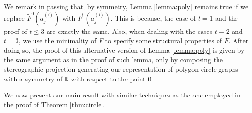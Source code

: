 \documentclass[12pt]{article}
\theoremstyle{definition}
\begin{document}
     We remark in passing that, by symmetry,
     Lemma \ref{lemma:poly} remains 
     true if we
     replace $\widetilde{F}^{0}\left(a_{j}^{\left(i\right)}\right)$ 
     with $\overline{F}^{0}\left(a_{j}^{\left(i\right)}\right)$.
     This is because, the case of $t = 1$
     and the proof of $t \leq 3$ are exactly
     the same. Also, when 
     dealing with the cases $t = 2$ 
     and $t = 3$, we use the minimality
     of $F$ to specify some structural
     properties of $F$. After doing so,
     the proof of this alternative version of
     Lemma \ref{lemma:poly} is given by 
     the same argument as in the proof
     of such lemma, only by composing
     the stereographic projection
     generating our representation
     of polygon circle graphs with
     a symmetry of $\mathbb{R}$ with
     respect to the point 0.

     We now present our main result
     with similar techniques as the one
     employed in the proof of
     Theorem \ref{thm:circle}.
\end{document}
